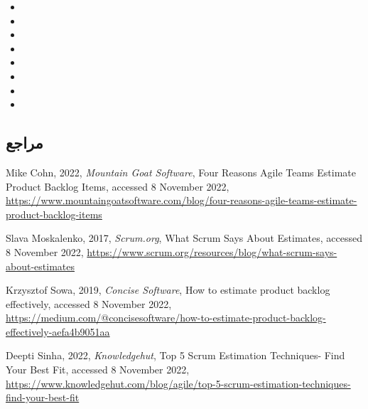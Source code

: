 {\begin{itemize}
\item
{}

\item
{}

\item
{}

\item
{}

\item
{}

\item
{}

\item
{}

\item
{}

\end{itemize}

\subsection*{مراجع}

\begin{latin}
	\begingroup
	\renewcommand{\section}[2]{}%
	
	\begin{thebibliography}{9}
		
		Mike Cohn,
		2022,
		\textit{Mountain Goat Software},
		Four Reasons Agile Teams Estimate Product Backlog Items, 
		accessed 8 November 2022,
		\url{https://www.mountaingoatsoftware.com/blog/four-reasons-agile-teams-estimate-product-backlog-items}
		
		Slava Moskalenko,
		2017,
		\textit{Scrum.org},
		What Scrum Says About Estimates, 
		accessed 8 November 2022,
		\url{https://www.scrum.org/resources/blog/what-scrum-says-about-estimates}
		
		Krzysztof Sowa,
		2019,
		\textit{Concise Software},
		How to estimate product backlog effectively, 
		accessed 8 November 2022,
		\url{https://medium.com/@concisesoftware/how-to-estimate-product-backlog-effectively-aefa4b9051aa}
		
		Deepti Sinha,
		2022,
		\textit{Knowledgehut},
		Top 5 Scrum Estimation Techniques- Find Your Best Fit, 
		accessed 8 November 2022,
		\url{https://www.knowledgehut.com/blog/agile/top-5-scrum-estimation-techniques-find-your-best-fit}
		

\end{thebibliography}
\end{latin}}
